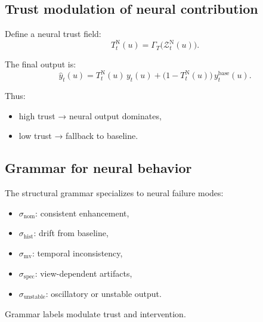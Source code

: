 \documentclass[11pt]{article}
\theoremstyle{definition}
\theoremstyle{plain}
\begin{document}

\subsection{Trust modulation of neural contribution}

Define a neural trust field:
\begin{equation}
T^{\mathrm{N}}_t(u)=\Gamma_T\!\bigl(\mathcal{Z}^{\mathrm{N}}_t(u)\bigr).
\end{equation}

The final output is:
\begin{equation}
\hat{y}_t(u)=
T^{\mathrm{N}}_t(u)\,y_t(u)
+
\bigl(1-T^{\mathrm{N}}_t(u)\bigr)\,y^{\mathrm{base}}_t(u).
\end{equation}

Thus:
\begin{itemize}[leftmargin=1.5em]
    \item high trust → neural output dominates,
    \item low trust → fallback to baseline.
\end{itemize}


\subsection{Grammar for neural behavior}

The structural grammar specializes to neural failure modes:

\begin{itemize}[leftmargin=1.5em]
    \item $\sigma_{\mathrm{nom}}$: consistent enhancement,
    \item $\sigma_{\mathrm{hist}}$: drift from baseline,
    \item $\sigma_{\mathrm{mv}}$: temporal inconsistency,
    \item $\sigma_{\mathrm{spec}}$: view-dependent artifacts,
    \item $\sigma_{\mathrm{unstable}}$: oscillatory or unstable output.
\end{itemize}

Grammar labels modulate trust and intervention.

\end{document}
